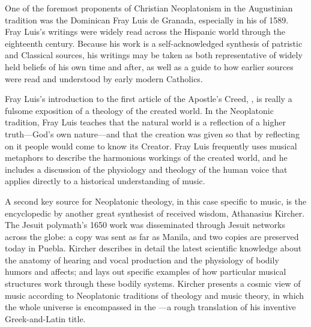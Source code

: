 One of the foremost proponents of Christian Neoplatonism in the Augustinian tradition was the Dominican Fray Luis de Granada, especially in his   of 1589.
Fray Luis's writings were widely read across the Hispanic world through the eighteenth century. 
Because his work is a self-acknowledged synthesis of patristic and Classical sources, his writings may be taken as both representative of widely held beliefs of his own time and after, as well as a guide to how earlier sources were read and understood by early modern Catholics.

Fray Luis's introduction to the first article of the Apostle's Creed, , is really a fulsome exposition of a theology of the created world.
In the Neoplatonic tradition, Fray Luis teaches that the natural world is a reflection of a higher truth---God's own nature---and that the creation was given so that by reflecting on it people would come to know its Creator.
Fray Luis frequently uses musical metaphors to describe the harmonious workings of the created world, and he includes a discussion of the physiology and theology of the human voice that applies directly to a historical understanding of music.

A second key source for Neoplatonic theology, in this case specific to music, is the encyclopedic  by another great synthesist of received wisdom, Athanasius Kircher.
The Jesuit polymath's 1650 work was disseminated through Jesuit networks across the globe: a copy was sent as far as Manila, and two copies are preserved today in Puebla.
Kircher describes in detail the latest scientific knowledge about the anatomy of hearing and vocal production and the physiology of bodily humors and affects; and lays out specific examples of how particular musical structures work through these bodily systems.
Kircher presents a cosmic view of music according to Neoplatonic traditions of theology and music theory, in which the whole universe is encompassed in the ---a rough translation of his inventive Greek-and-Latin title.%

